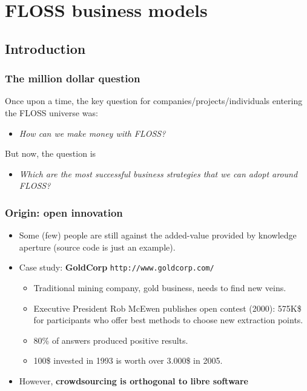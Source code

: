 
\section{FLOSS business models}

\subsection{Introduction}

\begin{frame}
\frametitle{The million dollar question}

Once upon a time, the key question for companies/projects/individuals entering the
FLOSS universe was:

\begin{itemize}
 \item \textit{How can we make money with FLOSS?}
\end{itemize}

\pause
But now, the question is

\begin{itemize}
\item \textit{Which are the most successful business strategies that we can adopt around FLOSS?}
\end{itemize}
\end{frame}

\begin{frame}
 \frametitle{Origin: open innovation}
 \begin{itemize}
  \item Some (few) people are still against the added-value provided by knowledge aperture (source
code is just an example).
  \item Case study: \textbf{GoldCorp} \texttt{http://www.goldcorp.com/}
    \begin{itemize}
    \item Traditional mining company, gold business, needs to find new veins.
    \item Executive President Rob McEwen publishes open contest (2000): 575K\$ for participants
    who offer best methods to choose new extraction points.
    \item 80\% of answers produced positive results.
    \item 100\$ invested in 1993 is worth over 3.000\$ in 2005.
    \end{itemize}
  \item However, \textbf{crowdsourcing is orthogonal to libre software}
 \end{itemize}
\end{frame}

